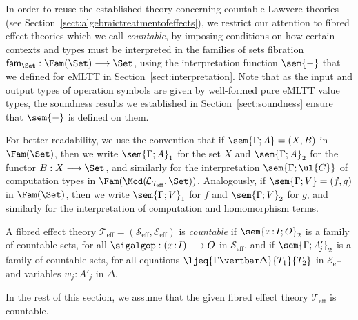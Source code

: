 In order to reuse the established theory concerning countable Lawvere theories (see Section~\ref{sect:algebraictreatmentofeffects}), we restrict our attention to fibred effect theories which we call \emph{countable}, by imposing conditions on how certain contexts and types must be interpreted in the families of sets fibration $\mathsf{fam}_{\Set} : \Fam(\Set) \longrightarrow \Set$, using the interpretation function $\sem{-}$ that we defined for eMLTT in Section~\ref{sect:interpretation}. Note that as the input and output types of operation symbols are given by well-formed pure eMLTT value types, the soundness results we established in Section~\ref{sect:soundness} ensure that $\sem{-}$ is defined on them.

For better readability, we use the convention that if $\sem{\Gamma; A} = (X, B)$ in $\Fam(\Set)$, then we write $\sem{\Gamma; A}_{1}$ for the set $X$ and $\sem{\Gamma; A}_{2}$ for the functor $B : X \longrightarrow \Set$, and similarly for the interpretation $\sem{\Gamma;\ul{C}}$ of computation types in $\Fam(\Mod(\!\mathcal{L}_{\mathcal{T}_{\text{eff}}},\Set))$. Analogously, if $\sem{\Gamma;V} = (f,g)$ in $\Fam(\Set)$, then we write $\sem{\Gamma;V}_1$ for $f$ and $\sem{\Gamma;V}_2$ for $g$, and similarly for the interpretation of computation and homomorphism terms.

\begin{definition}
\label{def:countableeffecthteory}
A fibred effect theory $\mathcal{T}_{\text{eff}} = (\mathcal{S}_{\text{eff}}, \mathcal{E}_{\text{eff}})$ is \emph{countable} if $\sem{x \!:\! I; O}_{2}$ is a family of countable sets, for all $\sigalgop : (x \!:\! I) \longrightarrow O$ in $\mathcal{S}_{\text{eff}}$, and if $\sem{\Gamma; A'_{\!j}}_{2}$ is a family \linebreak of countable sets, for all equations $\ljeq {\Gamma \vertbar \Delta} {T_1} {T_2}$ in $\mathcal{E}_{\text{eff}}$ and variables $w_{\!j} \!:\! A'_{\!j}$ in $\Delta$.
\end{definition}

In the rest of this section, we assume that the given fibred effect theory $\mathcal{T}_{\text{eff}}$ is countable.

